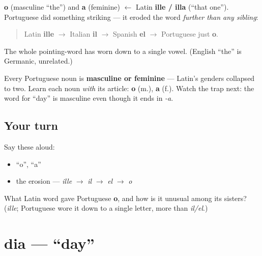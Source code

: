 \begin{cousinweb}
\textbf{o} (masculine \textquotedblleft{}the\textquotedblright{}) and \textbf{a} (feminine) $\leftarrow$ Latin \textbf{ille / illa} (\textquotedblleft{}that one\textquotedblright{}). Portuguese did something striking — it eroded the word \emph{further than any sibling}:

\begin{quote}
Latin \textbf{ille} $\to$ Italian \textbf{il} $\to$ Spanish \textbf{el} $\to$ Portuguese just \textbf{o}.
\end{quote}

The whole pointing-word has worn down to a single vowel. (English \textquotedblleft{}the\textquotedblright{} is Germanic, unrelated.)
\end{cousinweb}

\begin{grammarlens}[title={Grammar Lens: two genders}]
Every Portuguese noun is \textbf{masculine or feminine} — Latin's genders collapsed to two. Learn each noun \emph{with} its article: \textbf{o} (m.), \textbf{a} (f.). Watch the trap next: the word for \textquotedblleft{}day\textquotedblright{} is masculine even though it ends in \emph{-a}.
\end{grammarlens}

\subsection*{Your turn}
Say these aloud:

\begin{itemize}
\raggedright
  \item \textquotedblleft{}o\textquotedblright{}, \textquotedblleft{}a\textquotedblright{}
  \item the erosion — \emph{ille} $\to$ \emph{il} $\to$ \emph{el} $\to$ \emph{o}
\end{itemize}

\begin{tcolorbox}[breakable,colback=teal!4,colframe=teal!35!black,title={Before you move on}]
What Latin word gave Portuguese \textbf{o}, and how is it unusual among its sisters? (\emph{ille}; Portuguese wore it down to a single letter, more than \emph{il/el}.)
\end{tcolorbox}
\section[dia]{dia — \textquotedblleft{}day\textquotedblright{}}

